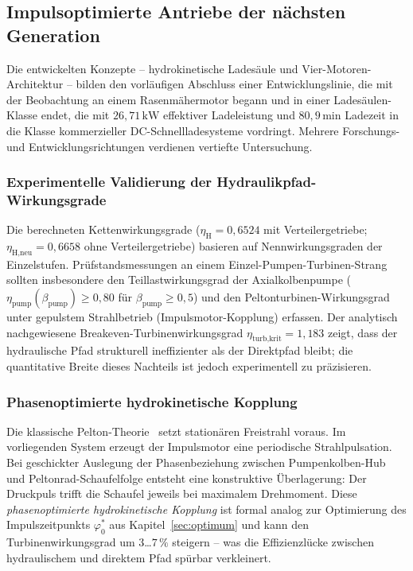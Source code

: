 ﻿\documentclass[a4paper,12pt]{article}
\begin{document}
\subsection{Impulsoptimierte Antriebe der nächsten Generation}
\label{sec:ausblick_kap12}

Die entwickelten Konzepte -- hydrokinetische Ladesäule und
Vier-Motoren-Architektur -- bilden den vorläufigen Abschluss einer
Entwicklungslinie, die mit der Beobachtung an einem Rasenmähermotor begann
und in einer Ladesäulen-Klasse endet, die mit $26{,}71\,\text{kW}$ effektiver
Ladeleistung und $80{,}9\,\text{min}$ Ladezeit in die Klasse kommerzieller
DC-Schnellladesysteme vordringt. Mehrere Forschungs- und Entwicklungsrichtungen
verdienen vertiefte Untersuchung.

\subsubsection{Experimentelle Validierung der Hydraulikpfad-Wirkungsgrade}

Die berechneten Kettenwirkungsgrade ($\eta_\text{H} = 0{,}6524$ mit
Verteilergetriebe; $\eta_\text{H,neu} = 0{,}6658$ ohne Verteilergetriebe)
basieren auf Nennwirkungsgraden der Einzelstufen. Prüfstandsmessungen an einem
Einzel-Pumpen-Turbinen-Strang sollten insbesondere den Teillastwirkungsgrad der
Axialkolbenpumpe ($\eta_\text{pump}(\beta_\text{pump}) \geq 0{,}80$ für
$\beta_\text{pump} \geq 0{,}5$) und den Peltonturbinen-Wirkungsgrad unter
gepulstem Strahlbetrieb (Impulsmotor-Kopplung) erfassen. Der analytisch
nachgewiesene Breakeven-Turbinenwirkungsgrad $\eta_\text{turb,krit} = 1{,}183$
zeigt, dass der hydraulische Pfad strukturell ineffizienter als der Direktpfad
bleibt; die quantitative Breite dieses Nachteils ist jedoch experimentell zu
präzisieren.

\subsubsection{Phasenoptimierte hydrokinetische Kopplung}

Die klassische Pelton-Theorie~\cite{mollenhauer2007} setzt stationären
Freistrahl voraus. Im vorliegenden System erzeugt der Impulsmotor eine
periodische Strahlpulsation. Bei geschickter Auslegung der Phasenbeziehung
zwischen Pumpenkolben-Hub und Peltonrad-Schaufelfolge entsteht eine
konstruktive Überlagerung: Der Druckpuls trifft die Schaufel jeweils bei
maximalem Drehmoment. Diese \textit{phasenoptimierte hydrokinetische Kopplung}
ist formal analog zur Optimierung des Impulszeitpunkts $\varphi_0^*$ aus
Kapitel~\ref{sec:optimum} und kann den Turbinenwirkungsgrad um
$3$\ldots$7\,\%$ steigern -- was die Effizienzlücke zwischen hydraulischem
und direktem Pfad spürbar verkleinert.
\end{document}
